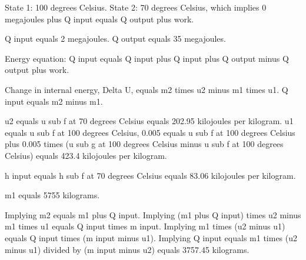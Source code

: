 State 1: 100 degrees Celsius.
State 2: 70 degrees Celsius, which implies 0 megajoules plus Q input equals Q output plus work.

Q input equals 2 megajoules.
Q output equals 35 megajoules.

Energy equation:
Q input equals Q input plus Q input plus Q output minus Q output plus work.

Change in internal energy, Delta U, equals m2 times u2 minus m1 times u1.
Q input equals m2 minus m1.

u2 equals u sub f at 70 degrees Celsius equals 202.95 kilojoules per kilogram.
u1 equals u sub f at 100 degrees Celsius, 0.005 equals u sub f at 100 degrees Celsius plus 0.005 times (u sub g at 100 degrees Celsius minus u sub f at 100 degrees Celsius) equals 423.4 kilojoules per kilogram.

h input equals h sub f at 70 degrees Celsius equals 83.06 kilojoules per kilogram.

m1 equals 5755 kilograms.

Implying m2 equals m1 plus Q input.
Implying (m1 plus Q input) times u2 minus m1 times u1 equals Q input times m input.
Implying m1 times (u2 minus u1) equals Q input times (m input minus u1).
Implying Q input equals m1 times (u2 minus u1) divided by (m input minus u2) equals 3757.45 kilograms.